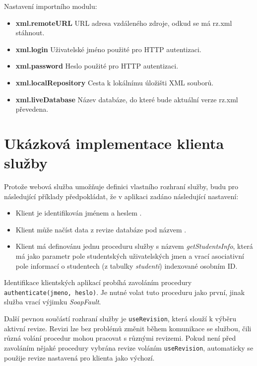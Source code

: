 \documentclass[11pt,twoside,a4paper]{book}
\begin{document}
Nastavení importního modulu:
\begin{itemize}
\item \textbf{xml.remoteURL} URL adresa vzdáleného zdroje, odkud se má rz.xml stáhnout.
\item \textbf{xml.login} Uživatelské jméno použité pro HTTP autentizaci.
\item \textbf{xml.password} Heslo použité pro HTTP autentizaci.
\item \textbf{xml.localRepository} Cesta k lokálnímu úložišti XML souborů.
\item \textbf{xml.liveDatabase} Název databáze, do které bude aktuální verze rz.xml převedena.
\end{itemize}


\section{Ukázková implementace klienta služby}
Protože webová služba umožňuje definici vlastního rozhraní služby, budu pro následující příklady předpokládat, že v aplikaci zadáno následující nastavení:
\begin{itemize}
\item Klient je identifikován jménem  a heslem .
\item Klient může načíst data z revize databáze pod názvem .
\item Klient má definovánu jednu proceduru služby s názvem \textit{getStudentsInfo}, která má jako parametr pole studentských uživatelských jmen a vrací asociativní pole informací o studentech (z tabulky \textit{studenti}) indexované osobním ID.
\end{itemize}

Identifikace klientských aplikací probíhá zavoláním procedury \texttt{authenticate(jmeno, heslo)}. Je nutné volat tuto proceduru jako první, jinak služba vrací výjimku \textit{SoapFault}.

Další pevnou součástí rozhraní služby je \texttt{useRevision}, která slouží k výběru aktivní revize. Revizi lze bez problémů změnit během komunikace se službou, čili různá volání procedur mohou pracovat s různými revizemi. Pokud není před zavoláním nějaké procedury vybrána revize voláním \texttt{useRevision}, automaticky se použije revize nastavená pro klienta jako výchozí.
\end{document}
